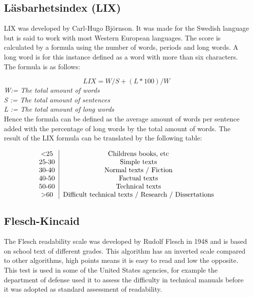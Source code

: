 \documentclass[a4paper]{article}
\begin{document}
\subsection{Läsbarhetsindex (LIX)}

LIX was developed by Carl-Hugo Björnson\cite{reck}. It was made for the Swedish language but is said to work with most Western European languages\cite{brown}. The score is calculated by a formula using the number of words, periods and long words. A long word is for this instance defined as a word with more than six characters. The formula is as follows\cite{reck, bjornsson68}:

\begin{equation}
    LIX = W/S+(L*100)/W
\end{equation}
\emph{W:= The total amount of words}\\
\emph{S := The total amount of sentences}\\
\emph{L := The total amount of long words}\\

Hence the formula can be defined as the average amount of words per sentence added with the percentage of long words by the total amount of words. The result of the LIX formula can be translated by the following table:

\begin{equation}
    \begin{tabular}{c|c}
        \textless 25    &   Childrens books, etc\\
        25-30   &   Simple texts \\
        30-40   &   Normal texts / Fiction \\
        40-50   &   Factual texts\\
        50-60   &   Technical texts \\
        \textgreater 60    &   Difficult technical texts / Research / Dissertations
    \end{tabular}
\end{equation}

\subsection{Flesch-Kincaid}

The Flesch readability scale was developed by Rudolf Flesch in 1948 and is based on school text of different grades\cite{navy75}. This algorithm has an inverted scale compared to other algorithms, high points means it is easy to read and low the opposite. This test is used in some of the United States agencies, for example the department of defense used it to assess the difficulty in technical manuals before it was adopted as standard assessment of readability\cite{navy75, mcclure87}.
\end{document}
